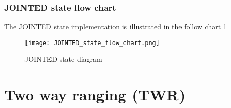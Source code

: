 \documentclass[./main.tex]{subfiles}
\begin{document}
\subsubsection{JOINTED state flow chart}
The JOINTED state implementation is illustrated in the follow chart \ref{fig:JOINTED_state_diagram}
\begin{figure}[ht]
    \begin{center}
        \texttt{[image: JOINTED\_state\_flow\_chart.png]}
    \end{center}
    \caption{JOINTED state diagram}
    \label{fig:JOINTED_state_diagram}
\end{figure}

\section{Two way ranging (TWR)}
\end{document}
